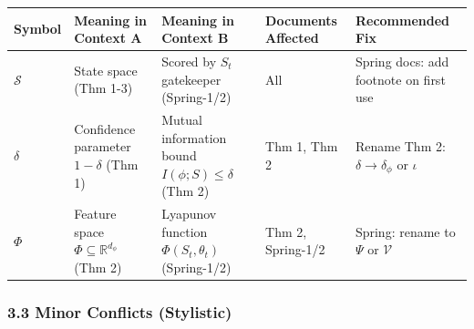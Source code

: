 \documentclass[
  12pt,
]{ctexart}
\begin{document}
\begin{longtable}[]{@{}
  >{\raggedright\arraybackslash}p{}
  >{\raggedright\arraybackslash}p{}
  >{\raggedright\arraybackslash}p{}
  >{\raggedright\arraybackslash}p{}
  >{\raggedright\arraybackslash}p{}@{}}
\toprule\noalign{}
\begin{minipage}[b]{\linewidth}\raggedright
Symbol
\end{minipage} & \begin{minipage}[b]{\linewidth}\raggedright
Meaning in Context A
\end{minipage} & \begin{minipage}[b]{\linewidth}\raggedright
Meaning in Context B
\end{minipage} & \begin{minipage}[b]{\linewidth}\raggedright
Documents Affected
\end{minipage} & \begin{minipage}[b]{\linewidth}\raggedright
Recommended Fix
\end{minipage} \\
\midrule\noalign{}
\endhead
\bottomrule\noalign{}
\endlastfoot
\(\mathcal{S}\) & State space (Thm 1-3) & Scored by \(S_t\) gatekeeper
(Spring-1/2) & All & Spring docs: add footnote on first use \\
\(\delta\) & Confidence parameter \(1-\delta\) (Thm 1) & Mutual
information bound \(I(\phi;S) \leq \delta\) (Thm 2) & Thm 1, Thm 2 &
Rename Thm 2: \(\delta \to \delta_{\phi}\) or \(\iota\) \\
\(\Phi\) & Feature space \(\Phi \subseteq \mathbb{R}^{d_\phi}\) (Thm 2)
& Lyapunov function \(\Phi(S_t, \theta_t)\) (Spring-1/2) & Thm 2,
Spring-1/2 & Spring: rename to \(\Psi\) or \(\mathcal{V}\) \\
\end{longtable}

\subsubsection{3.3 Minor Conflicts
(Stylistic)}\label{minor-conflicts-stylistic}
\end{document}

